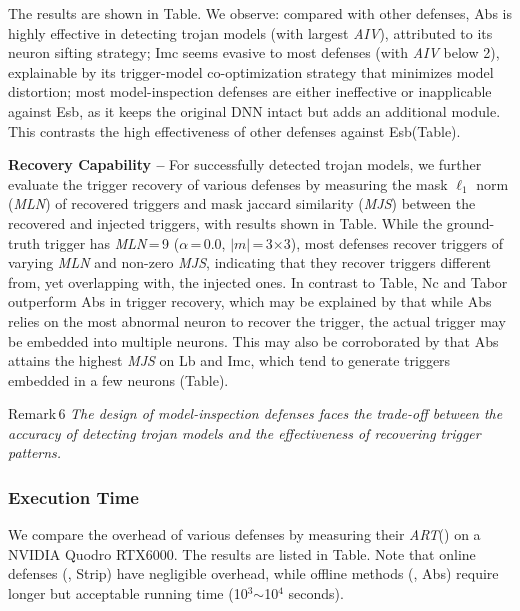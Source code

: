 \documentclass[compsoc,conference,a4paper,10pt,times]{IEEEtran}
\newcommand{\lb}{{\sc Lb}\xspace}
\newcommand{\esb}{{\sc Esb}\xspace}
\newcommand{\imc}{{\sc Imc}\xspace}
\newcommand{\mln}{{\em \small MLN}\xspace}
\newcommand{\art}{{\em \small ART}\xspace}
\newcommand{\mjs}{{\em \small MJS}\xspace}
\newcommand{\anidx}{{\em \small AIV}\xspace}
\newcommand{\nc}{{\sc Nc}\xspace}
\newcommand{\abs}{{\sc Abs}\xspace}
\newcommand{\tabor}{{\sc Tabor}\xspace}
\newcommand{\strip}{{\sc Strip}\xspace}
\begin{document}
 The results are shown in Table. We observe:  compared with other defenses, \abs is highly effective in detecting trojan models (with largest \anidx), attributed to its neuron sifting strategy;  \imc seems evasive to most defenses (with \anidx below 2), explainable by its trigger-model co-optimization strategy that minimizes model distortion;  most model-inspection defenses are either ineffective or inapplicable against \esb, as it keeps the original DNN intact but adds an additional module. This contrasts the high effectiveness of other defenses against \esb (\mcf Table).



\vspace{2pt}
{\bf Recovery Capability --} For successfully detected trojan models, we further evaluate the trigger recovery of various defenses by measuring the mask $\ell_1$ norm (\mln) of recovered triggers and mask jaccard similarity (\mjs) between the recovered and injected triggers, with results shown in Table. While the ground-truth trigger has \mln\,=\,9 ($\alpha$\,=\,0.0, $|m|$\,=\,3$\times$3), most defenses recover triggers of varying \mln and non-zero \mjs, indicating that they recover triggers different from, yet overlapping with, the injected ones. In contrast to Table, \nc and \tabor outperform \abs in trigger recovery, which may be explained by that while \abs relies on the most abnormal neuron to recover the trigger, the actual trigger may be embedded into multiple neurons. This may also be corroborated by that \abs attains the highest \mjs on \lb and \imc, which tend to generate triggers embedded in a few neurons (Table).
\begin{mtbox}{\small Remark\,6}
{\em \small The design of model-inspection defenses faces the trade-off between the accuracy of detecting trojan models and the effectiveness of recovering trigger patterns.}
\end{mtbox}


\subsubsection{Execution Time}
We compare the overhead of various defenses by measuring their \art () on a NVIDIA Quodro RTX6000. The results are listed in Table. Note that online defenses (\meg, \strip) have negligible overhead, while offline methods (\meg, \abs) require longer but acceptable running time (10$^3$$\sim$10$^4$ seconds).
\end{document}
